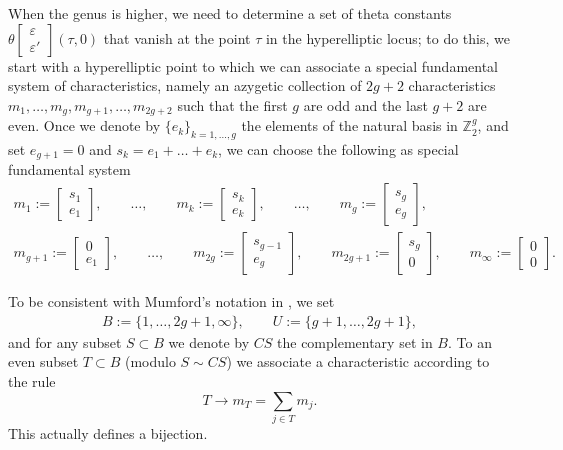 \documentclass[pdftex]{sigma}
\numberwithin{equation}{section}
\newcommand{\ep}{\varepsilon}
\newcommand{\ZZ}{{\mathbb{Z}}}
\def\ZZ{{\mathbb Z}}
\begin{document}
When the genus is higher, we need to determine a set of theta constants $\theta \left[\begin{smallmatrix} \ep \\ \ep ' \end{smallmatrix}\right] (\tau,0)$ that vanish at the point $\tau$ in the hyperelliptic locus; to do this, we start with a hyperelliptic point to which we can associate a special fundamental system of characteristics, namely an azygetic collection of $2g+2$ characteristics $m_1, \dots, m_g, m_{g+1}, \dots, m_{2g+2}$ such that the first $g$ are odd and the last $g+2$ are even. Once we denote by $\{e_k\}_{k=1, \dots, g}$ the elements of the natural basis in ${\ZZ^g_2}$, and set $e_{g+1}= 0$ and $s_k= e_1+\dots+e_k$, we can choose the following as special fundamental system
\begin{gather}
 m_1:=\begin{bmatrix} s_1 \\ e_1\end{bmatrix},\qquad \dots, \qquad m_k:=\begin{bmatrix} s_k \\ e_k\end{bmatrix},\qquad\dots,\qquad m_g:=\begin{bmatrix} s_g \\ e_g\end{bmatrix},
\nonumber\\
m_{g+1}:=\begin{bmatrix} 0 \\ e_{1}\end{bmatrix},\qquad \dots,\qquad m_{2g}:=\begin{bmatrix} s_{g-1} \\ e_{g}\end{bmatrix}, \qquad m_{2g+1}:=\begin{bmatrix} s_g \\ 0
\end{bmatrix},\qquad m_{\infty}:=\begin{bmatrix} 0 \\ 0 \end{bmatrix} .\label{eq:FS}
\end{gather}

To be consistent with Mumford's notation in \cite[p.~106]{mu}, we set
\begin{gather}\label{BU}
B:=\{1, \dots, 2g+ 1, \infty \} ,\qquad U:= \{ g+1, \dots , 2g+1 \},
\end{gather}
and for any subset $S\subset B$ we denote by $ CS$ the complementary set in $B$.
 To an even subset $T\subset B$ (modulo $S \sim CS$) we associate a characteristic according to the rule
 \[
T\to m_T= \sum_{j\in T} m_j .
\]
This actually defines a bijection.
\end{document}

